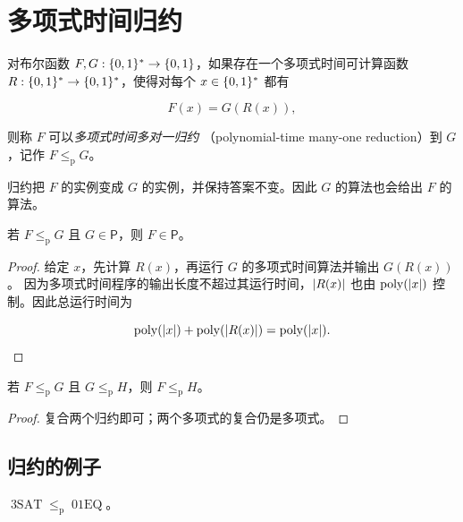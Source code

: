\section{多项式时间归约}

\begin{definition}[多项式时间归约]
  \label{def:polynomial-time-reduction}
  对布尔函数 $F,G:\{0,1\}^{*}\to\{0,1\}$，如果存在一个多项式时间可计算函数
  $R:\{0,1\}^{*}\to\{0,1\}^{*}$，使得对每个 $x\in\{0,1\}^{*}$ 都有

  \[
    F(x)=G(R(x)),
  \]

  则称 $F$ 可以\emph{多项式时间多对一归约}
  （polynomial-time many-one reduction）到 $G$，记作
  $F\leq_{\mathrm p}G$。
\end{definition}

归约把 $F$ 的实例变成 $G$ 的实例，并保持答案不变。因此 $G$ 的算法也会给出
$F$ 的算法。

\begin{proposition}
  \label{prop:reduction-preserves-p}
  若 $F\leq_{\mathrm p}G$ 且 $G\in\mathsf P$，则 $F\in\mathsf P$。
\end{proposition}

\begin{proof}
  给定 $x$，先计算 $R(x)$，再运行 $G$ 的多项式时间算法并输出 $G(R(x))$。
  因为多项式时间程序的输出长度不超过其运行时间，$\lvert R(x)\rvert$ 也由
  $\operatorname{poly}(\lvert x\rvert)$ 控制。因此总运行时间为

  \[
    \operatorname{poly}(\lvert x\rvert)
      +\operatorname{poly}(\lvert R(x)\rvert)
    =\operatorname{poly}(\lvert x\rvert).
  \]
\end{proof}

\begin{corollary}[归约的传递性]
  \label{cor:reduction-transitive}
  若 $F\leq_{\mathrm p}G$ 且 $G\leq_{\mathrm p}H$，则
  $F\leq_{\mathrm p}H$。
\end{corollary}

\begin{proof}
  复合两个归约即可；两个多项式的复合仍是多项式。
\end{proof}

\subsection{归约的例子}

\begin{proposition}
  \label{prop:3sat-reduces-zero-one-equations}
  $\operatorname{3SAT}\leq_{\mathrm p}\operatorname{01EQ}$。
\end{proposition}

